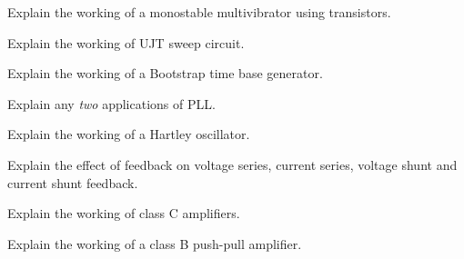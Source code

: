 \markB
\partC

\item \iitem Explain the working of a monostable multivibrator using transistors.
\Or
\item Explain the working of UJT sweep circuit.
\ene

\newpage \again

\item \iitem  Explain the working of a Bootstrap time base generator.
\Or
\item Explain any {\em two} applications of PLL.
\ene

\item \iitem Explain the working of a Hartley oscillator.
\Or
\item Explain the effect of feedback on voltage series, current series, voltage shunt and current
  shunt feedback.
\ene

\item \iitem Explain the working of class C amplifiers.
\Or
\item Explain the working of a class B push-pull amplifier.
\ene

\markC
\ene
